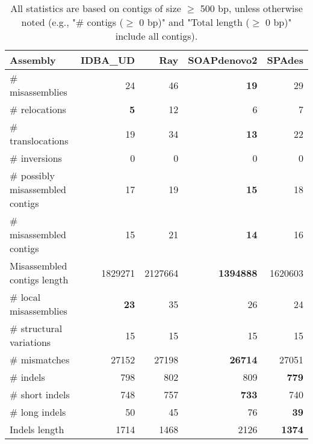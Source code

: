 \documentclass[12pt,a4paper]{article}
\begin{document}
\begin{table}[ht]
\begin{center}
\caption{All statistics are based on contigs of size $\geq$ 500 bp, unless otherwise noted (e.g., "\# contigs ($\geq$ 0 bp)" and "Total length ($\geq$ 0 bp)" include all contigs).}
\begin{tabular}{|l*{4}{|r}|}
\hline
Assembly & IDBA\_UD & Ray & SOAPdenovo2 & SPAdes \\ \hline
\# misassemblies & 24 & 46 & {\bf 19} & 29 \\ \hline
\hspace{5mm}\# relocations & {\bf 5} & 12 & 6 & 7 \\ \hline
\hspace{5mm}\# translocations & 19 & 34 & {\bf 13} & 22 \\ \hline
\hspace{5mm}\# inversions & 0 & 0 & 0 & 0 \\ \hline
\# possibly misassembled contigs & 17 & 19 & {\bf 15} & 18 \\ \hline
\# misassembled contigs & 15 & 21 & {\bf 14} & 16 \\ \hline
Misassembled contigs length & 1829271 & 2127664 & {\bf 1394888} & 1620603 \\ \hline
\# local misassemblies & {\bf 23} & 35 & 26 & 24 \\ \hline
\# structural variations & 15 & 15 & 15 & 15 \\ \hline
\# mismatches & 27152 & 27198 & {\bf 26714} & 27051 \\ \hline
\# indels & 798 & 802 & 809 & {\bf 779} \\ \hline
\hspace{5mm}\# short indels & 748 & 757 & {\bf 733} & 740 \\ \hline
\hspace{5mm}\# long indels & 50 & 45 & 76 & {\bf 39} \\ \hline
Indels length & 1714 & 1468 & 2126 & {\bf 1374} \\ \hline
\end{tabular}
\end{center}
\end{table}
\end{document}
